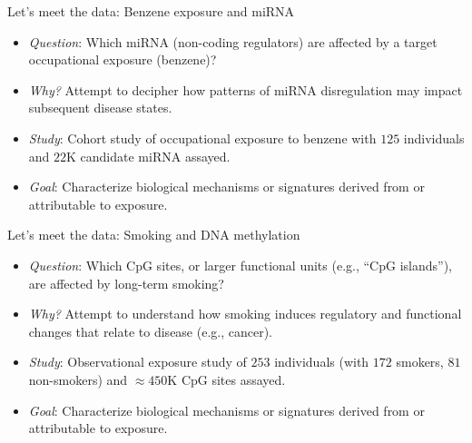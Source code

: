 \documentclass{beamer}
\begin{document}

\begin{frame}[c]{Let's meet the data: Benzene exposure and miRNA}
\begin{center}
\begin{itemize}
  \itemsep6pt
  \item \textit{Question}: Which miRNA (non-coding regulators) are affected by
    a target occupational exposure (benzene)?
  \item \textit{Why?} Attempt to decipher how patterns of miRNA disregulation
    may impact subsequent disease states.
  \item \textit{Study}: Cohort study of occupational exposure to benzene with
    $125$ individuals and $22$K candidate miRNA assayed.
  \item \textit{Goal}: Characterize biological mechanisms or signatures derived
    from or attributable to exposure.
\end{itemize}
\end{center}

\note{
}
\end{frame}


\begin{frame}[c]{Let's meet the data: Smoking and DNA methylation}
\begin{center}
\begin{itemize}
  \itemsep6pt
  \item \textit{Question}: Which CpG sites, or larger functional units (e.g.,
    ``CpG islands''), are affected by long-term smoking?
  \item \textit{Why?} Attempt to understand how smoking induces regulatory and
    functional changes that relate to disease (e.g., cancer).
  \item \textit{Study}: Observational exposure study of $253$ individuals (with
    $172$ smokers, $81$ non-smokers) and $\approx 450$K CpG sites assayed.
  \item \textit{Goal}: Characterize biological mechanisms or signatures derived
    from or attributable to exposure.
\end{itemize}
\end{center}

\note{
}
\end{frame}

\end{document}
